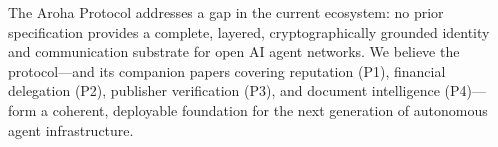 \documentclass[conference]{IEEEtran}
\begin{document}
The Aroha Protocol addresses a gap in the current ecosystem: no
prior specification provides a complete, layered, cryptographically
grounded identity and communication substrate for open AI agent
networks. We believe the protocol—and its companion papers
covering reputation (P1), financial delegation (P2), publisher
verification (P3), and document intelligence (P4)—form a
coherent, deployable foundation for the next generation of
autonomous agent infrastructure.



\end{document}
